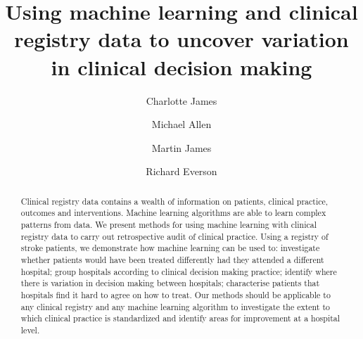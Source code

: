 \documentclass[12pt,a4paper, pdftex]{elsarticle}
\begin{document}
\begin{frontmatter}


\title{Using machine learning and clinical registry data to uncover variation in clinical decision making}

\author[inst1]{Charlotte James}

\author[inst1,inst2]{Michael Allen}

\author[inst1,inst3]{Martin James}

\author[inst4]{Richard Everson}




            

\begin{abstract}
Clinical registry data contains a wealth of information on patients, clinical practice, outcomes and interventions. Machine learning algorithms are able to learn complex patterns from data. 
%
We present methods for using machine learning with clinical registry data to carry out retrospective audit of clinical practice. Using a registry of stroke patients, we demonstrate how machine learning can be used to: investigate whether patients would have been treated differently had they attended a different hospital; group hospitals according to clinical decision making practice; identify where there is variation in decision making between hospitals; characterise patients that hospitals find it hard to agree on how to treat.
%
Our methods should be applicable to any clinical registry and any machine learning algorithm to investigate the extent to which clinical practice is standardized and identify areas for improvement at a hospital level.


\end{abstract}




\end{frontmatter}
\end{document}
